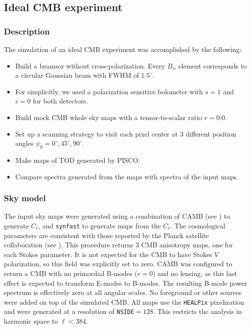 \documentclass[a4paper,11pt]{article}
\begin{document}
\subsection{Ideal CMB experiment}
\label{subsec::ideal_full_sky}

\subsubsection{Description}

The simulation of an ideal CMB experiment was accomplished by the following:

\begin{itemize}
    \item Build a beamsor without cross-polarization. Every $B_{ii}$ element corresponds to a circular Gaussian beam with FWHM of $1.5^\circ$. 
    \item For simplicitly, we used a polarization sensitive bolometer with $s=1$ and $\epsilon=0$ for both detectors.
    \item Build mock CMB whole sky maps with a tensor-to-scalar ratio $r=0.0$.
	\item Set up a scanning strategy to visit each pixel center at 3 different position angles $\psi_0 = 0^{\circ},45^{\circ},90^{\circ}$. 
	\item Make maps of TOD generated by PISCO. 
	\item Compare spectra generated from the maps with spectra of the input maps.
\end{itemize}

\subsubsection{Sky model}
\label{subsec::sky_model}

The input sky maps were generated using a combination of CAMB (see \cite{Lewis:2002ah}) to generate $C_\ell$, and \texttt{synfast} to generate maps from the $C_\ell$. The cosmological parameters are consistent with those reported by the Planck satellite collaboration (see \cite{2016A&A...594A..13P}). This procedure returns 3 CMB anisotropy maps, one for each Stokes parameter. It is not expected for the CMB to have Stokes $V$ polarization, so this field was explicitly set to zero. CAMB was configured to return a CMB with no primordial B-modes ($r=0$) and no lensing, as this last effect is expected to transform E-modes to B-modes. The resulting B-mode power spectrum is effectively zero at all angular scales. No foreground or other sources were added on top of the simulated CMB. All maps use the \texttt{HEALPix} pixelization and were generated at a resolution of \texttt{NSIDE}$=128$. This restricts the analysis in harmonic space to $\ell < 384$.
\end{document}
